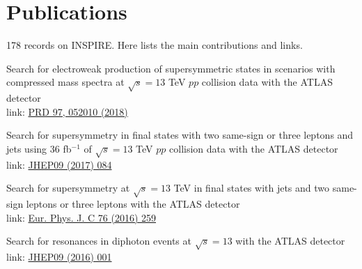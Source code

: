 \documentclass[letterpaper]{deedy-resume-openfont}
\begin{document}
\section{Publications}
178 records on INSPIRE. Here lists the main contributions and links.

\location{}
\begin{tightemize}
\item Search for electroweak production of supersymmetric states in scenarios with compressed mass spectra at $\sqrt{s} = 13$ TeV $pp$ collision data with the ATLAS detector\\
      link: \href{https://journals.aps.org/prd/abstract/10.1103/PhysRevD.97.052010}{PRD 97, 052010 (2018)}
\item Search for supersymmetry in final states with two same-sign or three leptons and jets using 36 fb$^{-1}$ of $\sqrt{s} = 13$ TeV $pp$ collision data with the ATLAS detector\\
      link: \href{https://link.springer.com/article/10.1007/JHEP09(2017)084}{JHEP09 (2017) 084}
\item Search for supersymmetry at $\sqrt{s} = 13$ TeV in final states with jets and two same-sign leptons or three leptons with the ATLAS detector\\
      link: \href{https://link.springer.com/article/10.1140%2Fepjc%2Fs10052-016-4095-8}{Eur. Phys. J. C 76 (2016) 259}
\item Search for resonances in diphoton events at $\sqrt{s} = 13$ with the ATLAS detector\\
      link: \href{https://link.springer.com/article/10.1007/JHEP09(2016)001}{JHEP09 (2016) 001}
\end{tightemize}
\sectionsep
\end{document}
